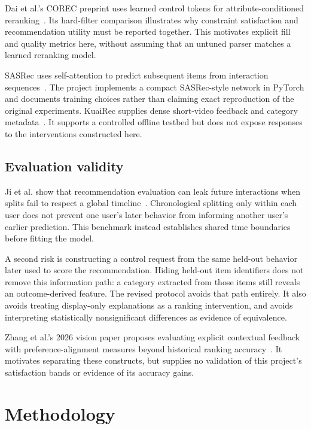 \documentclass[conference]{IEEEtran}
\begin{document}
Dai et al.'s COREC preprint uses learned control tokens for attribute-conditioned reranking~\cite{dai2025token}. Its hard-filter comparison illustrates why constraint satisfaction and recommendation utility must be reported together. This motivates explicit fill and quality metrics here, without assuming that an untuned parser matches a learned reranking model.

SASRec uses self-attention to predict subsequent items from interaction sequences~\cite{kang2018sasrec}. The project implements a compact SASRec-style network in PyTorch and documents training choices rather than claiming exact reproduction of the original experiments. KuaiRec supplies dense short-video feedback and category metadata~\cite{gao2022kuairec}. It supports a controlled offline testbed but does not expose responses to the interventions constructed here.

\subsection{Evaluation validity}
Ji et al. show that recommendation evaluation can leak future interactions when splits fail to respect a global timeline~\cite{ji2023leakage}. Chronological splitting only within each user does not prevent one user's later behavior from informing another user's earlier prediction. This benchmark instead establishes shared time boundaries before fitting the model.

A second risk is constructing a control request from the same held-out behavior later used to score the recommendation. Hiding held-out item identifiers does not remove this information path: a category extracted from those items still reveals an outcome-derived feature. The revised protocol avoids that path entirely. It also avoids treating display-only explanations as a ranking intervention, and avoids interpreting statistically nonsignificant differences as evidence of equivalence.

Zhang et al.'s 2026 vision paper proposes evaluating explicit contextual feedback with preference-alignment measures beyond historical ranking accuracy~\cite{zhang2026context}. It motivates separating these constructs, but supplies no validation of this project's satisfaction bands or evidence of its accuracy gains.

\section{Methodology}
\end{document}
